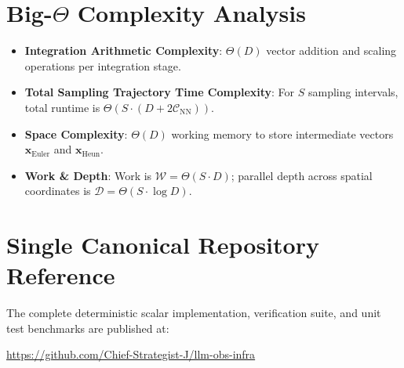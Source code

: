 \documentclass[11pt,a4paper]{article}
\theoremstyle{definition}
\begin{document}
\section{Big-$\Theta$ Complexity Analysis}

\begin{itemize}
    \item \textbf{Integration Arithmetic Complexity}: $\Theta(D)$ vector addition and scaling operations per integration stage.
    \item \textbf{Total Sampling Trajectory Time Complexity}: For $S$ sampling intervals, total runtime is $\Theta(S \cdot (D + 2 \mathcal{C}_{\text{NN}}))$.
    \item \textbf{Space Complexity}: $\Theta(D)$ working memory to store intermediate vectors $\mathbf{x}_{\text{Euler}}$ and $\mathbf{x}_{\text{Heun}}$.
    \item \textbf{Work \& Depth}: Work is $\mathcal{W} = \Theta(S \cdot D)$; parallel depth across spatial coordinates is $\mathcal{D} = \Theta(S \cdot \log D)$.
\end{itemize}

\section{Single Canonical Repository Reference}

The complete deterministic scalar implementation, verification suite, and unit test benchmarks are published at:
\begin{center}
\url{https://github.com/Chief-Strategist-J/llm-obs-infra}
\end{center}
\end{document}
